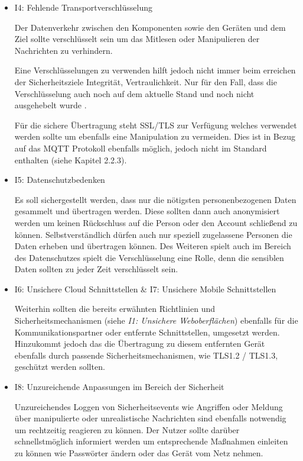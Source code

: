 \begin{itemize}
            \item I4: Fehlende Transportverschlüsselung
            
            Der Datenverkehr zwischen den Komponenten sowie den Geräten und dem Ziel sollte verschlüsselt sein um das Mitlesen oder Manipulieren der Nachrichten zu verhindern.
            
            Eine Verschlüsselungen zu verwenden hilft jedoch nicht immer beim erreichen der Sicherheitsziele Integrität, Vertraulichkeit. Nur für den Fall, dass die Verschlüsselung auch noch auf dem aktuelle Stand und noch nicht ausgehebelt wurde \cite{bsi_2019}.
            
            Für die sichere Übertragung steht SSL/TLS zur Verfügung welches verwendet werden sollte um ebenfalls eine Manipulation zu vermeiden. Dies ist in Bezug auf das \ac{MQTT} Protokoll ebenfalls möglich, jedoch nicht im Standard enthalten (siehe Kapitel 2.2.3).
            
            \item I5: Datenschutzbedenken
            
            Es soll sichergestellt werden, dass nur die nötigsten personenbezogenen Daten gesammelt und übertragen werden. Diese sollten dann auch anonymisiert werden um keinen Rückschluss auf die Person oder den Account schließend zu können.
            Selbstverständlich dürfen auch nur speziell zugelassene Personen die Daten erheben und übertragen können.
            Des Weiteren spielt auch im Bereich des Datenschutzes spielt die Verschlüsselung eine Rolle, denn die sensiblen Daten sollten zu jeder Zeit verschlüsselt sein.
    
            \item I6: Unsichere Cloud Schnittstellen \& I7: Unsichere Mobile Schnittstellen
            
            Weiterhin sollten die bereits erwähnten Richtlinien und Sicherheitsmechanismen (siehe \emph{I1: Unsichere Weboberflächen}) ebenfalls für die Kommunikationspartner oder entfernte Schnittstellen,  
            umgesetzt werden. Hinzukommt jedoch das die Übertragung zu diesem entfernten Gerät ebenfalls durch passende Sicherheitsmechanismen, wie TLS1.2 / TLS1.3, geschützt werden sollten.
            
            \item I8: Unzureichende Anpassungen im Bereich der Sicherheit
            
            Unzureichendes Loggen von Sicherheitsevents wie Angriffen oder Meldung über manipulierte oder unrealistische Nachrichten sind ebenfalls notwendig um rechtzeitig reagieren zu können. Der Nutzer sollte darüber schnellstmöglich informiert werden um entsprechende Maßnahmen einleiten zu können wie Passwörter ändern oder das Gerät vom Netz nehmen.
            

\end{itemize}

